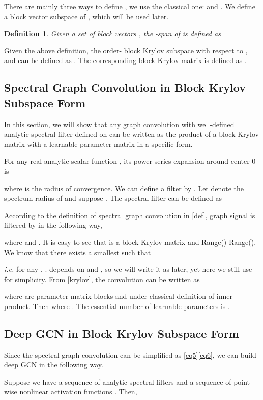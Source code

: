 \documentclass{article}
\newcommand\ie{\textit{i.e.}}
\newtheorem{definition}{Definition}
\begin{document}
There are mainly three ways to define , we use the classical one:   and . We define a block vector subspace of , which will be used later.
\begin{definition}
Given a set of block vectors , the -span of  is defined as 
\end{definition}
Given the above definition, the order- block Krylov subspace with respect to , and   can be defined as . The corresponding block Krylov matrix is defined as .

\subsection{Spectral Graph Convolution in Block Krylov Subspace Form}
\label{conv_in_krylov}
In this section, we will show that any graph convolution with well-defined analytic spectral filter defined on  can be written as the product of a block Krylov matrix with a learnable parameter matrix in a specific form.

For any real analytic scalar function , its power series expansion around center 0 is

where  is the radius of convergence. We can define a filter by .
Let  denote the spectrum radius of  and suppose . The spectral filter  can be defined as

According to the definition of spectral graph convolution in \eqref{def}, graph signal  is filtered by  in the following way,

where  and . It is easy to see that   is a block Krylov matrix and Range()  Range().  We know that there exists a smallest  such that \cite{gutknecht2009block,frommer2017block}

\ie{} for any , .  depends on  and , so we will write it as  later, yet here we still use  for simplicity. From \eqref{krylov}, the convolution can be written as

where  are parameter matrix blocks and  under classical definition of inner product. Then
where . The essential  number of learnable parameters is . \subsection{Deep GCN in Block Krylov Subspace Form}
\label{deep_gcn_krylov}
Since the spectral graph convolution can be simplified as \eqref{eq5}\eqref{eq6}, we can build deep GCN in the following way.
	
Suppose we have a sequence of analytic spectral filters  and a sequence of point-wise nonlinear activation functions . Then,
\end{document}
